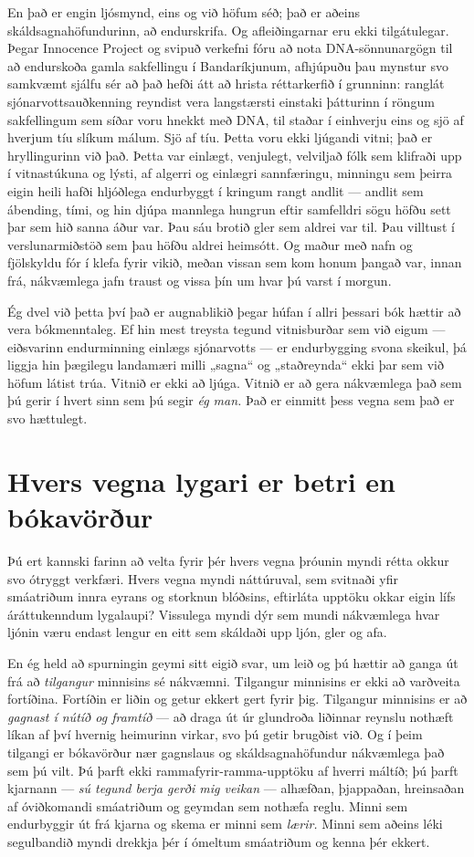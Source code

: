 En það er engin ljósmynd, eins og við höfum séð; það er aðeins skáldsagnahöfundurinn, að endurskrifa. Og afleiðingarnar eru ekki tilgátulegar. Þegar Innocence Project og svipuð verkefni fóru að nota DNA-sönnunargögn til að endurskoða gamla sakfellingu í Bandaríkjunum, afhjúpuðu þau mynstur svo samkvæmt sjálfu sér að það hefði átt að hrista réttarkerfið í grunninn: ranglát sjónarvottsauðkenning reyndist vera langstærsti einstaki þátturinn í röngum sakfellingum sem síðar voru hnekkt með DNA, til staðar í einhverju eins og sjö af hverjum tíu slíkum málum. Sjö af tíu. Þetta voru ekki ljúgandi vitni; það er hryllingurinn við það. Þetta var einlægt, venjulegt, velviljað fólk sem klifraði upp í vitnastúkuna og lýsti, af algerri og einlægri sannfæringu, minningu sem þeirra eigin heili hafði hljóðlega endurbyggt í kringum rangt andlit — andlit sem ábending, tími, og hin djúpa mannlega hungrun eftir samfelldri sögu höfðu sett þar sem hið sanna áður var. Þau sáu brotið gler sem aldrei var til. Þau villtust í verslunarmiðstöð sem þau höfðu aldrei heimsótt. Og maður með nafn og fjölskyldu fór í klefa fyrir vikið, meðan vissan sem kom honum þangað var, innan frá, nákvæmlega jafn traust og vissa þín um hvar þú varst í morgun.

Ég dvel við þetta því það er augnablikið þegar húfan í allri þessari bók hættir að vera bókmenntaleg. Ef hin mest treysta tegund vitnisburðar sem við eigum — eiðsvarinn endurminning einlægs sjónarvotts — er endurbygging svona skeikul, þá liggja hin þægilegu landamæri milli „sagna“ og „staðreynda“ ekki þar sem við höfum látist trúa. Vitnið er ekki að ljúga. Vitnið er að gera nákvæmlega það sem þú gerir í hvert sinn sem þú segir \emph{ég man.} Það er einmitt þess vegna sem það er svo hættulegt.

\section*{Hvers vegna lygari er betri en bókavörður}

Þú ert kannski farinn að velta fyrir þér hvers vegna þróunin myndi rétta okkur svo ótryggt verkfæri. Hvers vegna myndi náttúruval, sem svitnaði yfir smáatriðum innra eyrans og storknun blóðsins, eftirláta upptöku okkar eigin lífs áráttukenndum lygalaupi? Vissulega myndi dýr sem mundi nákvæmlega hvar ljónin væru endast lengur en eitt sem skáldaði upp ljón, gler og afa.

En ég held að spurningin geymi sitt eigið svar, um leið og þú hættir að ganga út frá að \emph{tilgangur} minnisins sé nákvæmni. Tilgangur minnisins er ekki að varðveita fortíðina. Fortíðin er liðin og getur ekkert gert fyrir þig. Tilgangur minnisins er að \emph{gagnast í nútíð og framtíð} — að draga út úr glundroða liðinnar reynslu nothæft líkan af því hvernig heimurinn virkar, svo þú getir brugðist við. Og í þeim tilgangi er bókavörður nær gagnslaus og skáldsagnahöfundur nákvæmlega það sem þú vilt. Þú þarft ekki rammafyrir-ramma-upptöku af hverri máltíð; þú þarft kjarnann — \emph{sú tegund berja gerði mig veikan} — alhæfðan, þjappaðan, hreinsaðan af óviðkomandi smáatriðum og geymdan sem nothæfa reglu. Minni sem endurbyggir út frá kjarna og skema er minni sem \emph{lærir.} Minni sem aðeins léki segulbandið myndi drekkja þér í ómeltum smáatriðum og kenna þér ekkert.

